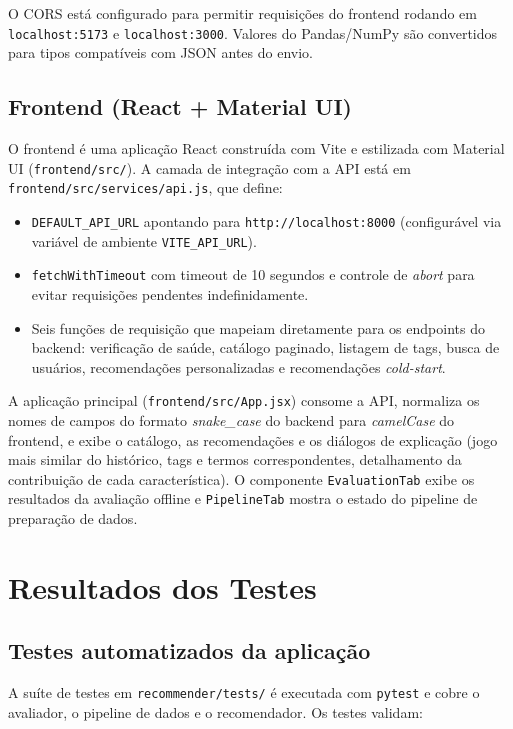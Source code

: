 \documentclass[12pt,a4paper]{article}
\begin{document}
O CORS está configurado para permitir requisições do frontend rodando em \texttt{localhost:5173} e \texttt{localhost:3000}. Valores do Pandas/NumPy são convertidos para tipos compatíveis com JSON antes do envio.

\subsection{Frontend (React + Material UI)}

O frontend é uma aplicação React construída com Vite e estilizada com Material UI (\texttt{frontend/src/}). A camada de integração com a API está em \texttt{frontend/src/services/api.js}, que define:

\begin{itemize}
    \item \texttt{DEFAULT\_API\_URL} apontando para \texttt{http://localhost:8000} (configurável via variável de ambiente \texttt{VITE\_API\_URL}).
    \item \texttt{fetchWithTimeout} com timeout de 10 segundos e controle de \emph{abort} para evitar requisições pendentes indefinidamente.
    \item Seis funções de requisição que mapeiam diretamente para os endpoints do backend: verificação de saúde, catálogo paginado, listagem de tags, busca de usuários, recomendações personalizadas e recomendações \textit{cold-start}.
\end{itemize}

A aplicação principal (\texttt{frontend/src/App.jsx}) consome a API, normaliza os nomes de campos do formato \textit{snake\_case} do backend para \textit{camelCase} do frontend, e exibe o catálogo, as recomendações e os diálogos de explicação (jogo mais similar do histórico, tags e termos correspondentes, detalhamento da contribuição de cada característica). O componente \texttt{EvaluationTab} exibe os resultados da avaliação offline e \texttt{PipelineTab} mostra o estado do pipeline de preparação de dados.

\section{Resultados dos Testes}

\subsection{Testes automatizados da aplicação}

A suíte de testes em \texttt{recommender/tests/} é executada com \texttt{pytest} e cobre o avaliador, o pipeline de dados e o recomendador. Os testes validam:
\end{document}
